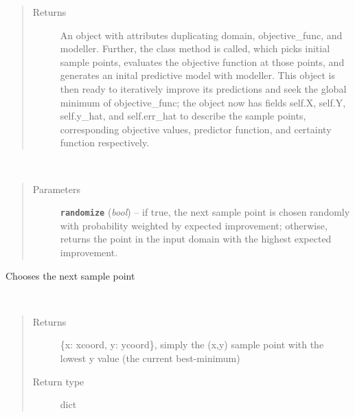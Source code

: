 \documentclass[letterpaper,10pt,english]{sphinxmanual}
\begin{document}
\begin{fulllineitems}
\begin{quote}
\begin{description}
\item[{Returns}] \leavevmode
An object with attributes duplicating domain, objective\_func, and modeller. Further, the class method
 is called, which picks initial sample points, evaluates the objective function at
those points, and generates an inital predictive model with modeller. This object is then ready to
iteratively improve its predictions and seek the global minimum of objective\_func; the object now has fields
self.X, self.Y, self.y\_hat, and self.err\_hat to describe the sample points, corresponding objective values,
predictor function, and certainty function respectively.

\end{description}\end{quote}

\begin{fulllineitems}
\label{index:smbo.smb_optimizer.smb_optimizer.choose_sample}~\begin{quote}\begin{description}
\item[{Parameters}] \leavevmode
\textbf{\texttt{randomize}} (\emph{bool}) -- if true, the next sample point is chosen randomly with probability weighted by expected improvement; otherwise, returns the point in the input domain with the highest expected improvement.

\end{description}\end{quote}

Chooses the next sample point

\end{fulllineitems}


\begin{fulllineitems}
\label{index:smbo.smb_optimizer.smb_optimizer.find_min}~\begin{quote}\begin{description}
\item[{Returns}] \leavevmode
\{x: xcoord, y: ycoord\}, simply the (x,y) sample point with the lowest y value (the current best-minimum)

\item[{Return type}] \leavevmode
dict

\end{description}\end{quote}

\end{fulllineitems}


\end{fulllineitems}
\end{document}
